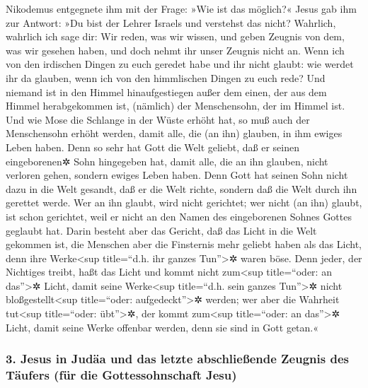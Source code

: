  Nikodemus entgegnete ihm mit der Frage: »Wie ist das
möglich?«  Jesus gab ihm zur Antwort: »Du bist der Lehrer
Israels und verstehst das nicht?  Wahrlich, wahrlich ich
sage dir: Wir reden, was wir wissen, und geben Zeugnis von dem, was wir
gesehen haben, und doch nehmt ihr unser Zeugnis nicht an.
 Wenn ich von den irdischen Dingen zu euch geredet habe
und ihr nicht glaubt: wie werdet ihr da glauben, wenn ich von den
himmlischen Dingen zu euch rede?  Und niemand ist in den
Himmel hinaufgestiegen außer dem einen, der aus dem Himmel herabgekommen
ist, (nämlich) der Menschensohn, der im Himmel ist.  Und
wie Mose die Schlange in der Wüste erhöht hat, so muß auch der
Menschensohn erhöht werden,  damit alle, die (an ihn)
glauben, in ihm ewiges Leben haben.  Denn so sehr hat
Gott die Welt geliebt, daß er seinen eingeborenen✲ Sohn hingegeben hat,
damit alle, die an ihn glauben, nicht verloren gehen, sondern ewiges
Leben haben.  Denn Gott hat seinen Sohn nicht dazu in die
Welt gesandt, daß er die Welt richte, sondern daß die Welt durch ihn
gerettet werde.  Wer an ihn glaubt, wird nicht gerichtet;
wer nicht (an ihn) glaubt, ist schon gerichtet, weil er nicht an den
Namen des eingeborenen Sohnes Gottes geglaubt hat.  Darin
besteht aber das Gericht, daß das Licht in die Welt gekommen ist, die
Menschen aber die Finsternis mehr geliebt haben als das Licht, denn ihre
Werke\textless sup title=``d.h. ihr ganzes Tun''\textgreater✲ waren
böse.  Denn jeder, der Nichtiges treibt, haßt das Licht
und kommt nicht zum\textless sup title=``oder: an das''\textgreater✲
Licht, damit seine Werke\textless sup title=``d.h. sein ganzes
Tun''\textgreater✲ nicht bloßgestellt\textless sup title=``oder:
aufgedeckt''\textgreater✲ werden;  wer aber die Wahrheit
tut\textless sup title=``oder: übt''\textgreater✲, der kommt
zum\textless sup title=``oder: an das''\textgreater✲ Licht, damit seine
Werke offenbar werden, denn sie sind in Gott getan.«

\hypertarget{jesus-in-juduxe4a-und-das-letzte-abschlieuxdfende-zeugnis-des-tuxe4ufers-fuxfcr-die-gottessohnschaft-jesu}{%
\subsubsection{3. Jesus in Judäa und das letzte abschließende Zeugnis
des Täufers (für die Gottessohnschaft
Jesu)}\label{jesus-in-juduxe4a-und-das-letzte-abschlieuxdfende-zeugnis-des-tuxe4ufers-fuxfcr-die-gottessohnschaft-jesu}}

